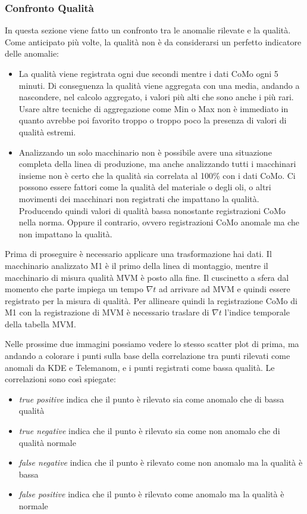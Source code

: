 \subsubsection{Confronto Qualità}
In questa sezione viene fatto un confronto tra le anomalie rilevate e la qualità. Come anticipato più volte, la qualità non è da considerarsi un perfetto indicatore delle anomalie: 
\begin{itemize}
	\item La qualità viene registrata ogni due secondi mentre i dati CoMo ogni 5 minuti. Di conseguenza la qualità viene aggregata con una media, andando a nascondere, nel calcolo aggregato, i valori più alti che sono anche i più rari. Usare altre tecniche di aggregazione come Min o Max non è immediato in quanto avrebbe poi favorito troppo o troppo poco la presenza di valori di qualità estremi.
	\item Analizzando un solo macchinario non è possibile avere una situazione completa della linea di produzione, ma anche analizzando tutti i macchinari insieme non è certo che la qualità sia correlata al 100\% con i dati CoMo. Ci possono essere fattori come la qualità del materiale o degli oli, o altri movimenti dei macchinari non registrati che impattano la qualità. Producendo quindi valori di qualità bassa nonostante registrazioni CoMo nella norma. Oppure il contrario, ovvero registrazioni CoMo anomale ma che non impattano la qualità.
\end{itemize}

Prima di proseguire è  necessario applicare una trasformazione hai dati. Il macchinario analizzato M1 è il primo della linea di montaggio, mentre il macchinario di misura qualità MVM è  posto alla fine. Il cuscinetto a sfera dal momento che parte impiega un tempo ${\nabla}t$ ad arrivare ad MVM e quindi essere registrato per la misura di qualità. Per allineare quindi la registrazione CoMo di M1 con la registrazione di MVM è necessario traslare di ${\nabla}t$ l'indice temporale della tabella MVM.

Nelle prossime due immagini possiamo vedere lo stesso scatter plot di prima, ma andando a colorare i punti sulla base della correlazione tra punti rilevati come anomali da KDE e Telemanom, e i punti registrati come bassa qualità. Le correlazioni sono così spiegate:
\begin{itemize}
	\item \textit{true positive} indica che il punto è rilevato sia come anomalo che di bassa qualità
	\item \textit{true negative} indica che il punto è rilevato sia come non anomalo che di qualità normale
	\item \textit{false negative} indica che il punto è rilevato come non anomalo ma la qualità è bassa
	\item \textit{false positive} indica che il punto è rilevato come anomalo ma la qualità è normale
\end{itemize}

